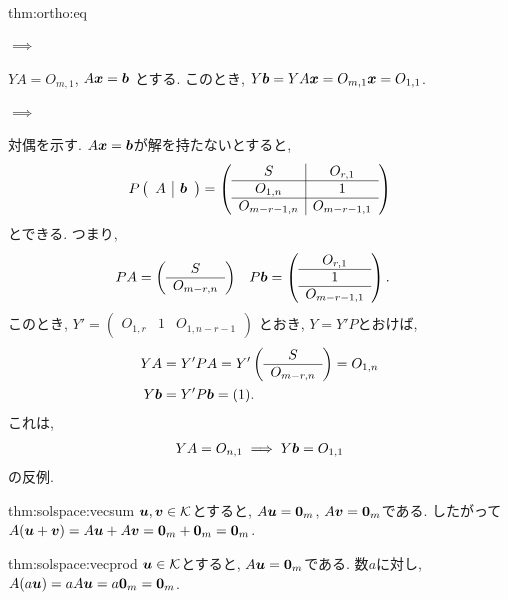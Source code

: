\begin{proofof}{thm:ortho:eq}
  \paragraph{$\implies$}
  $YA=O_{m,1}$, $A\boldsymbol{x}=\boldsymbol{b}$
  とする.
  このとき, $Y\boldsymbol{b}=YA\boldsymbol{x}=O_{m,1}\boldsymbol{x}=O_{1,1}$.
  \paragraph{$\implies$}
  対偶を示す.
  $A\boldsymbol{x}=\boldsymbol{b}$が解を持たないとすると,
  \begin{align*}
    P\left(\begin{array}{c|c}A& \boldsymbol{b}\end{array}\right)=
    \left(
    \begin{array}{c|c}
      S&O_{r,1}\\\hline
      O_{1,n}&1\\\hline
      O_{m-r-1,n}&O_{m-r-1,1}
    \end{array}
    \right)
  \end{align*}
  とできる.
  つまり,
  \begin{align*}
    PA&=\left(\begin{array}{c}S\\\hline O_{m-r,n}\end{array}\right)&
    P\boldsymbol{b}&=
    \left(
    \begin{array}{c}
      O_{r,1}\\\hline
      1\\\hline
      O_{m-r-1,1}
    \end{array}
    \right).
  \end{align*}
  このとき,
  $Y'= \left(\begin{array}{c|c|c}O_{1,r}&1&O_{1,n-r-1}\end{array}\right)$
  とおき, $Y=Y'P$とおけば,
  \begin{align*}
    YA&=Y'PA=Y'\left(\begin{array}{c}S\\\hline O_{m-r,n}\end{array}\right)=O_{1,n}\\
    Y\boldsymbol{b}&=Y'P\boldsymbol{b}=(1).
  \end{align*}
  これは,
  \begin{align*}
    YA=O_{n,1}\implies
    Y\boldsymbol{b}=O_{1,1}
  \end{align*}
  の反例.
\end{proofof}
\begin{proofof*}{thm:solspace:vec}{sum}
  $\boldsymbol{u},\boldsymbol{v}\in\mathcal{K}$とすると, $A\boldsymbol{u}=\boldsymbol{0}_m$, $A\boldsymbol{v}=\boldsymbol{0}_m$である.
  したがって$A(\boldsymbol{u}+\boldsymbol{v})=A\boldsymbol{u}+A\boldsymbol{v}=\boldsymbol{0}_m+\boldsymbol{0}_m=\boldsymbol{0}_m$.
\end{proofof*}
\begin{proofof*}{thm:solspace:vec}{prod}
  $\boldsymbol{u}\in\mathcal{K}$とすると, $A\boldsymbol{u}=\boldsymbol{0}_m$である.
  数$a$に対し,
  $A(a\boldsymbol{u})=aA\boldsymbol{u}=a\boldsymbol{0}_m=\boldsymbol{0}_m$.
\end{proofof*}

